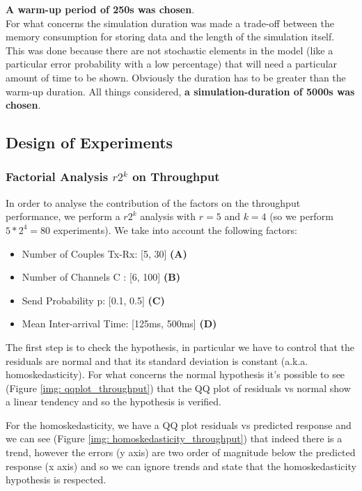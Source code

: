 \noindent\textbf{A warm-up period of 250s was chosen}.\\
For what concerns the simulation duration was made a trade-off between the memory consumption for storing data and the length of the simulation itself. This was done because there are not stochastic elements in the model (like a particular error probability with a low percentage) that will need a particular amount of time to be shown. Obviously the duration has to be greater than the warm-up duration. All things considered, \textbf{a simulation-duration of 5000s was chosen}.

\subsection{Design of Experiments}
\subsubsection{Factorial Analysis $r2^k$ on Throughput}
In order to analyse the contribution of the factors on the throughput performance, we perform a $r2^k$ analysis with $r=5$ and $k=4$ (so we perform $5*2^4 = 80$ experiments). We take into account the following factors:
\begin{itemize}
	\item Number of Couples Tx-Rx: [5, 30] \textbf{(A)}
	\item Number of Channels C : [6, 100] \textbf{(B)}
	\item Send Probability p: [0.1, 0.5] \textbf{(C)}
	\item Mean Inter-arrival Time: [125ms, 500ms] \textbf{(D)}    
\end{itemize}

\noindent The first step is to check the hypothesis, in particular we have to control that the residuals are normal and that its standard deviation is constant (a.k.a. homoskedasticity). For what concerns the normal hypothesis it's possible to see (Figure \ref{img: qqplot_throughput}) that the QQ plot of residuals vs normal show a linear tendency and so the hypothesis is verified.

\noindent For the homoskedasticity, we have a QQ plot residuals vs predicted response and we can see (Figure \ref{img: homoskedasticity_throughput}) that indeed there is a trend, however the errors (y axis) are two order of magnitude below the predicted response (x axis) and so we can ignore trends and state that the homoskedasticity hypothesis is respected.

